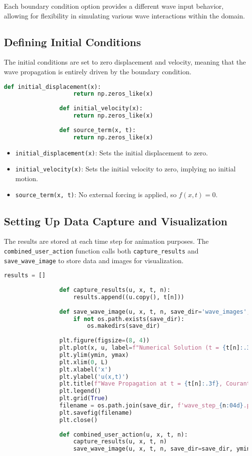\documentclass{article}
\begin{document}
			Each boundary condition option provides a different wave input behavior, allowing for flexibility in simulating various wave interactions within the domain. 
			
			
			\subsection{Defining Initial Conditions}
			
			The initial conditions are set to zero displacement and velocity, meaning that the wave propagation is entirely driven by the boundary condition.
			
			\begin{lstlisting}[language=Python]
				def initial_displacement(x):
					return np.zeros_like(x)
				
				def initial_velocity(x):
					return np.zeros_like(x)
				
				def source_term(x, t):
					return np.zeros_like(x)
			\end{lstlisting}
			
			\begin{itemize}
				\item \texttt{initial\_displacement(x)}: Sets the initial displacement to zero.
				\item \texttt{initial\_velocity(x)}: Sets the initial velocity to zero, implying no initial motion.
				\item \texttt{source\_term(x, t)}: No external forcing is applied, so \( f(x, t) = 0 \).
			\end{itemize}
			
			\subsection{Setting Up Data Capture and Visualization}
			
			The results are stored at each time step for animation purposes. The \texttt{combined\_user\_action} function calls both \texttt{capture\_results} and \texttt{save\_wave\_image} to store data and images for visualization.
			
			\begin{lstlisting}[language=Python]
				results = []
				
				def capture_results(u, x, t, n):
					results.append((u.copy(), t[n]))
				
				def save_wave_image(u, x, t, n, save_dir='wave_images', ymin=-0.6, ymax=0.7):
					if not os.path.exists(save_dir):
						os.makedirs(save_dir)
				
				plt.figure(figsize=(8, 4))
				plt.plot(x, u, label=f"Numerical Solution (t = {t[n]:.3f})", color="blue")
				plt.ylim(ymin, ymax)
				plt.xlim(0, L)
				plt.xlabel('x')
				plt.ylabel('u(x,t)')
				plt.title(f"Wave Propagation at t = {t[n]:.3f}, Courant number = {C}")
				plt.legend()
				plt.grid(True)
				filename = os.path.join(save_dir, f'wave_step_{n:04d}.png')
				plt.savefig(filename)
				plt.close()
				
				def combined_user_action(u, x, t, n):
					capture_results(u, x, t, n)
					save_wave_image(u, x, t, n, save_dir=save_dir, ymin=-0.6, ymax=0.7)
			\end{lstlisting}
			
\end{document}
